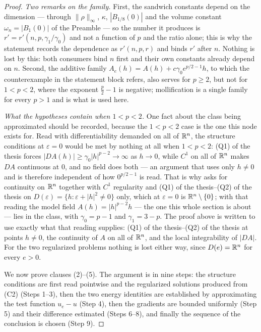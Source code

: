 \begin{proof}
\emph{Two remarks on the family.}  First, the sandwich constants depend on the
dimension --- through $\|\rho\|_\infty$, $\kappa$, $|B_{1/8}(0)|$ and the
volume constant $\omega_n=|B_1(0)|$ of the Preamble --- so the number it
produces is
$r'=r'(n,p,\gamma_1/\gamma_0)$ and not a function of $p$ and the ratio alone;
this is why the statement records the dependence as $r'(n,p,r)$ and binds $r'$
after $n$.  Nothing is lost by this: both consumers bind $n$ first and their own
constants already depend on $n$.  Second, the additive family
$A_e(h)=A(h)+c\gamma_0e^{p/2-1}h$, to which the counterexample in the statement
block refers, also serves for $p\ge2$, but not for $1<p<2$, where the exponent
$\tfrac p2-1$ is negative; mollification is a single family for every $p>1$ and
is what is used here.

\emph{What the hypotheses contain when $1<p<2$.}  One fact about the class being
approximated should be recorded, because the $1<p<2$ case is the one this node
exists for.  Read with differentiability demanded on all of $\mathbb{R}^n$, the
structure conditions at $\varepsilon=0$ would be met by nothing at all when
$1<p<2$: (Q1) of the thesis forces $|DA(h)|\ge\gamma_0|h|^{p-2}\to\infty$ as
$h\to0$, while $C^1$ on all of $\mathbb{R}^n$ makes $DA$ continuous at $0$, and no field
does both --- an argument that uses only $h\ne0$ and is therefore independent of
how $0^{p/2-1}$ is read.  That is why  asks for
continuity on $\mathbb{R}^n$ together with $C^1$ regularity and
(Q1) of the thesis--(Q2) of the thesis on $D(\varepsilon)=\{h:\varepsilon+|h|^2\ne0\}$
only, which at $\varepsilon=0$ is $\mathbb{R}^n\setminus\{0\}$; with that reading the
model field $A(h)=|h|^{p-2}h$ --- the one this whole section is about --- lies in
the class, with $\gamma_0=p-1$ and $\gamma_1=3-p$.  The proof above is written to
use exactly what that reading supplies: (Q1) of the thesis--(Q2) of the thesis at points
$h\ne0$, the continuity of $A$ on all of $\mathbb{R}^n$, and the local integrability of
$|DA|$.  For the two regularized problems nothing is lost either way, since
$D(e)=\mathbb{R}^n$ for every $e>0$.

\medskip
We now prove clauses (2)--(5).  The argument is in nine steps: the structure
conditions are first read pointwise and the regularized solutions produced from
(C2) (Steps 1--3), then the two energy identities are established by
approximating the test function $u_e-u$ (Step 4), then the gradients are bounded
uniformly (Step 5) and their difference estimated (Steps 6--8), and finally the
sequence of the conclusion is chosen (Step 9).


\end{proof}
